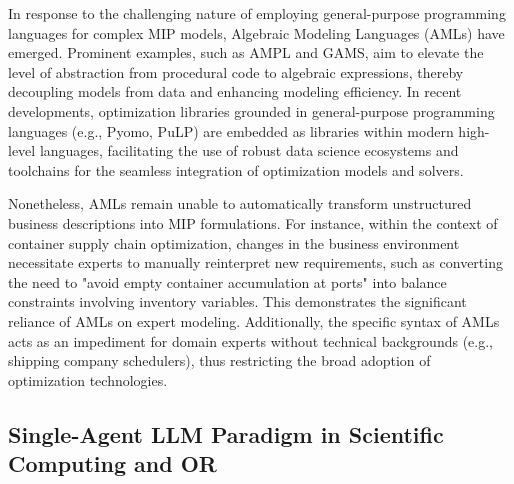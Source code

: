 \documentclass[preprint,12pt]{elsarticle}
\begin{document}
In response to the challenging nature of employing general-purpose programming languages for complex MIP models, Algebraic Modeling Languages (AMLs) have emerged. Prominent examples, such as AMPL and GAMS, aim to elevate the level of abstraction from procedural code to algebraic expressions, thereby decoupling models from data and enhancing modeling efficiency.  In recent developments, optimization libraries grounded in general-purpose programming languages (e.g., Pyomo, PuLP) are embedded as libraries within modern high-level languages, facilitating the use of robust data science ecosystems and toolchains for the seamless integration of optimization models and solvers. 

Nonetheless, AMLs remain unable to automatically transform unstructured business descriptions into MIP formulations. For instance, within the context of container supply chain optimization, changes in the business environment necessitate experts to manually reinterpret new requirements, such as converting the need to "avoid empty container accumulation at ports" into balance constraints involving inventory variables. This demonstrates the significant reliance of AMLs on expert modeling. Additionally, the specific syntax of AMLs acts as an impediment for domain experts without technical backgrounds (e.g., shipping company schedulers), thus restricting the broad adoption of optimization technologies.

\subsection{Single-Agent LLM Paradigm in Scientific Computing and OR}
\end{document}
